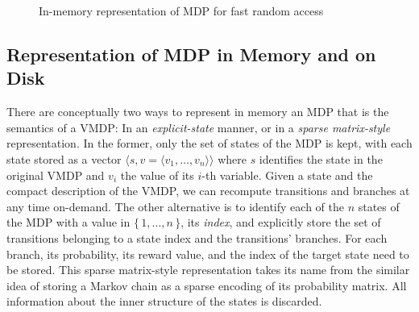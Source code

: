 \documentclass{llncs}
\newcommand{\set}[1]{\ensuremath{\{\,#1\,\}}}
\newcommand{\tuple}[1]{\ensuremath{\langle #1 \rangle}}
\begin{document}
\begin{figure}[t]
\caption{In-memory representation of MDP for fast random access}
\label{fig:SparseMatrixMemory}
\end{figure}


\subsection{Representation of MDP in Memory and on Disk}

There are conceptually two ways to represent in memory an MDP that is the semantics of a VMDP:
In an \emph{explicit-state} manner, or in a \emph{sparse matrix-style} representation.
In the former, only the set of states of the MDP is kept, with each state stored as a vector $\tuple{s, v = \tuple{ v_1, \dots, v_n }}$ where $s$ identifies the state in the original VMDP and $v_{i}$ the value of its $i$-th variable.
Given a state and the compact description of the VMDP, we can recompute transitions and branches at any time on-demand.
The other alternative is to identify each of the $n$ states of the MDP with a value in $\set{1, \dots, n}$, its \emph{index}, and explicitly store the set of transitions belonging to a state index and the transitions' branches.
For each branch, its probability, its reward value, and the index of the target state need to be stored.
This sparse matrix-style representation takes its name from the similar idea of storing a Markov chain as a sparse encoding of its probability matrix.
All information about the inner structure of the states is discarded.
\end{document}
